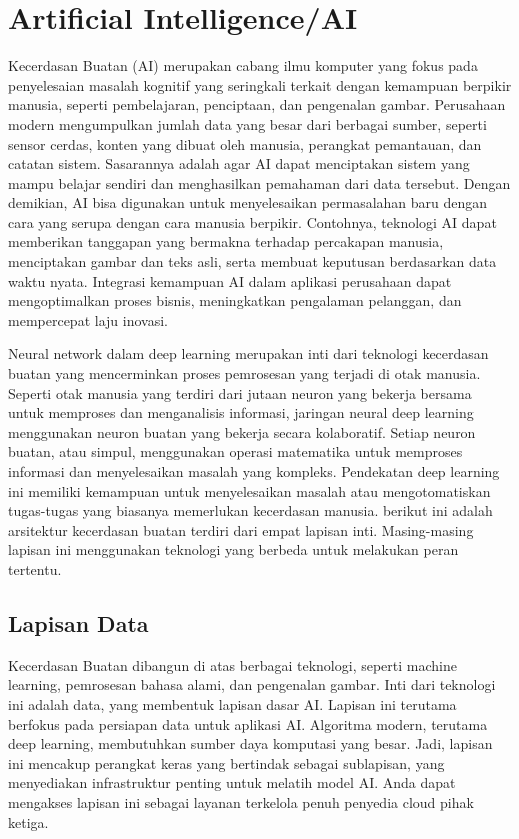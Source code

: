 \section{Artificial Intelligence/AI}
Kecerdasan Buatan (AI) merupakan cabang ilmu komputer yang fokus pada penyelesaian masalah kognitif yang seringkali terkait dengan kemampuan berpikir manusia, seperti pembelajaran, penciptaan, dan pengenalan gambar. Perusahaan modern mengumpulkan jumlah data yang besar dari berbagai sumber, seperti sensor cerdas, konten yang dibuat oleh manusia, perangkat pemantauan, dan catatan sistem. Sasarannya adalah agar AI dapat menciptakan sistem yang mampu belajar sendiri dan menghasilkan pemahaman dari data tersebut. Dengan demikian, AI bisa digunakan untuk menyelesaikan permasalahan baru dengan cara yang serupa dengan cara manusia berpikir. Contohnya, teknologi AI dapat memberikan tanggapan yang bermakna terhadap percakapan manusia, menciptakan gambar dan teks asli, serta membuat keputusan berdasarkan data waktu nyata. Integrasi kemampuan AI dalam aplikasi perusahaan dapat mengoptimalkan proses bisnis, meningkatkan pengalaman pelanggan, dan mempercepat laju inovasi.

Neural network dalam deep learning merupakan inti dari teknologi kecerdasan buatan yang mencerminkan proses pemrosesan yang terjadi di otak manusia. Seperti otak manusia yang terdiri dari jutaan neuron yang bekerja bersama untuk memproses dan menganalisis informasi, jaringan neural deep learning menggunakan neuron buatan yang bekerja secara kolaboratif. Setiap neuron buatan, atau simpul, menggunakan operasi matematika untuk memproses informasi dan menyelesaikan masalah yang kompleks. Pendekatan deep learning ini memiliki kemampuan untuk menyelesaikan masalah atau mengotomatiskan tugas-tugas yang biasanya memerlukan kecerdasan manusia. berikut ini adalah arsitektur kecerdasan buatan terdiri dari empat lapisan inti. Masing-masing lapisan ini menggunakan teknologi yang berbeda untuk melakukan peran tertentu. 

\subsection{Lapisan Data}
Kecerdasan Buatan dibangun di atas berbagai teknologi, seperti machine learning, pemrosesan bahasa alami, dan pengenalan gambar. Inti dari teknologi ini adalah data, yang membentuk lapisan dasar AI. Lapisan ini terutama berfokus pada persiapan data untuk aplikasi AI. Algoritma modern, terutama deep learning, membutuhkan sumber daya komputasi yang besar. Jadi, lapisan ini mencakup perangkat keras yang bertindak sebagai sublapisan, yang menyediakan infrastruktur penting untuk melatih model AI. Anda dapat mengakses lapisan ini sebagai layanan terkelola penuh penyedia cloud pihak ketiga.


